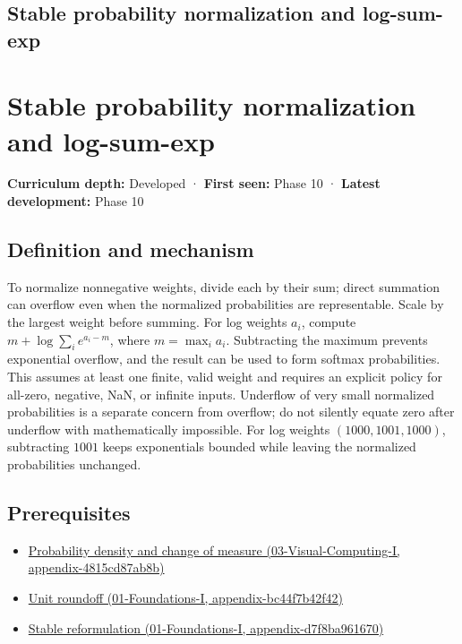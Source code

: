 \hypertarget{appendix-d580b422240f}{}
\section*{Stable probability normalization and log-sum-exp}
\chapter{Stable probability normalization and log-sum-exp}\label{appendix-d580b422240f-stable-probability-normalization-and-log-sum-exp}

\textbf{Curriculum depth:} Developed · \textbf{First seen:} Phase 10 · \textbf{Latest development:} Phase 10

\section{Definition and mechanism}\label{appendix-d580b422240f-definition-and-mechanism}

To normalize nonnegative weights, divide each by their sum; direct summation can overflow even when the normalized probabilities are representable. Scale by the largest weight before summing. For log weights \(a_i\), compute \(m+\log\sum_i e^{a_i-m}\), where \(m=\max_i a_i\). Subtracting the maximum prevents exponential overflow, and the result can be used to form softmax probabilities. This assumes at least one finite, valid weight and requires an explicit policy for all-zero, negative, NaN, or infinite inputs. Underflow of very small normalized probabilities is a separate concern from overflow; do not silently equate zero after underflow with mathematically impossible. For log weights \((1000,1001,1000)\), subtracting \(1001\) keeps exponentials bounded while leaving the normalized probabilities unchanged.

\section{Prerequisites}\label{appendix-d580b422240f-prerequisites}

\begin{itemize}
\tightlist
\item
  \href{../03-Visual-Computing-I/main.pdf\#nameddest=appendix-4815cd87ab8b}{Probability density and change of measure (03-Visual-Computing-I, appendix-4815cd87ab8b)}
\item
  \href{../01-Foundations-I/main.pdf\#nameddest=appendix-bc44f7b42f42}{Unit roundoff (01-Foundations-I, appendix-bc44f7b42f42)}
\item
  \href{../01-Foundations-I/main.pdf\#nameddest=appendix-d7f8ba961670}{Stable reformulation (01-Foundations-I, appendix-d7f8ba961670)}
\end{itemize}

